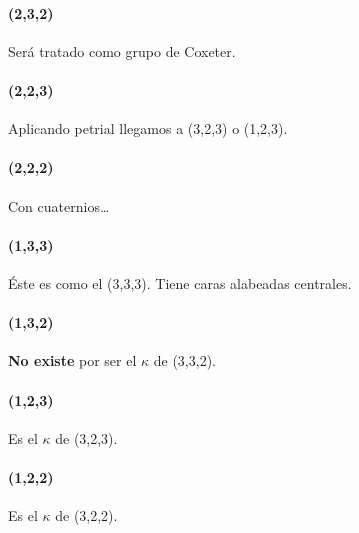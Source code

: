 \documentclass[spanish]{article}
\theoremstyle{definition}
\begin{document}
\paragraph{\textbf{(2,3,2)}} Será tratado como grupo de Coxeter.

\paragraph{\textbf{(2,2,3)}} Aplicando petrial llegamos a (3,2,3) o (1,2,3).

\paragraph{\textbf{(2,2,2)}} Con cuaternios…

\paragraph{\textbf{(1,3,3)}} Éste es como el (3,3,3). Tiene caras alabeadas centrales.

\paragraph{\textbf{(1,3,2)}} \textbf{No existe} por ser el $\kappa$ de (3,3,2).

\paragraph{\textbf{(1,2,3)}} Es el $\kappa$ de (3,2,3).

\paragraph{\textbf{(1,2,2)}} Es el $\kappa$ de (3,2,2).
\end{document}
